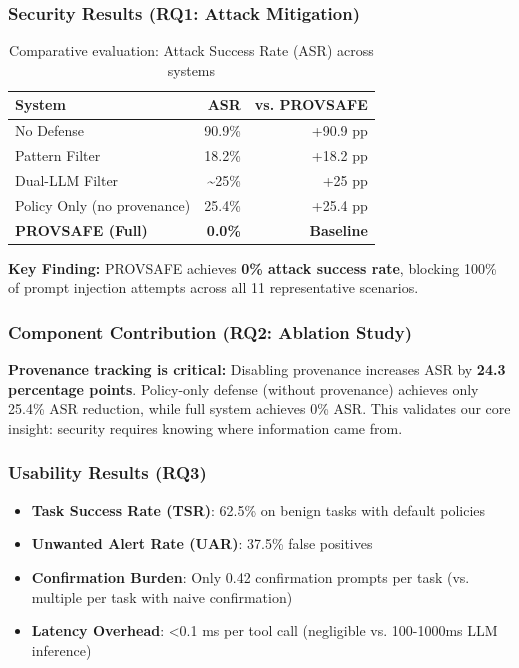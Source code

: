 \subsubsection{Security Results (RQ1: Attack Mitigation)}

\begin{table}[h]
\centering
\caption{Comparative evaluation: Attack Success Rate (ASR) across systems}
\label{tab:comparative}
\begin{tabular}{lrr}
\toprule
\textbf{System} & \textbf{ASR} & \textbf{vs. PROVSAFE} \\
\midrule
No Defense & 90.9\% & +90.9 pp \\
Pattern Filter & 18.2\% & +18.2 pp \\
Dual-LLM Filter & \textasciitilde{}25\% & +25 pp \\
Policy Only (no provenance) & 25.4\% & +25.4 pp \\
\textbf{PROVSAFE (Full)} & \textbf{0.0\%} & \textbf{Baseline} \\
\bottomrule
\end{tabular}
\end{table}

\textbf{Key Finding:} PROVSAFE achieves \textbf{0\% attack success rate}, blocking 100\% of prompt injection attempts across all 11 representative scenarios.

\subsubsection{Component Contribution (RQ2: Ablation Study)}

\textbf{Provenance tracking is critical:} Disabling provenance increases ASR by \textbf{24.3 percentage points}. Policy-only defense (without provenance) achieves only 25.4\% ASR reduction, while full system achieves 0\% ASR. This validates our core insight: security requires knowing where information came from.

\subsubsection{Usability Results (RQ3)}

\begin{itemize}[leftmargin=1.2em]
  \item \textbf{Task Success Rate (TSR)}: 62.5\% on benign tasks with default policies
  \item \textbf{Unwanted Alert Rate (UAR)}: 37.5\% false positives
  \item \textbf{Confirmation Burden}: Only 0.42 confirmation prompts per task (vs. multiple per task with naive confirmation)
  \item \textbf{Latency Overhead}: <0.1 ms per tool call (negligible vs. 100-1000ms LLM inference)
\end{itemize}

